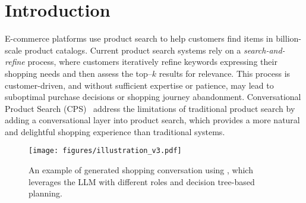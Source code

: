 
\section{Introduction}\label{sec:intro}

E-commerce platforms use product search to help customers find items in billion-scale product catalogs. 
Current product search systems rely on a \textit{search-and-refine} process, where customers iteratively refine keywords expressing their shopping needs and then assess the top--$k$ results for relevance. %
This process is customer-driven, and without sufficient expertise or patience, may lead to suboptimal purchase decisions or shopping journey abandonment. 
Conversational Product Search (CPS)~\cite{zhang2018towards,bi2019conversational,zou2022learning} %
address the limitations of traditional product search by adding a conversational layer into product search, which provides a more natural and delightful shopping experience than traditional systems.


\begin{figure}[t!]
\centering
\texttt{[image: figures/illustration\_v3.pdf]}
\vspace{-2.5em}
\caption{An example of generated shopping conversation using \method, which leverages the LLM with different roles and decision tree-based planning.%
}
\vspace{-1.5em}
\label{fig:illustration}
\end{figure}


